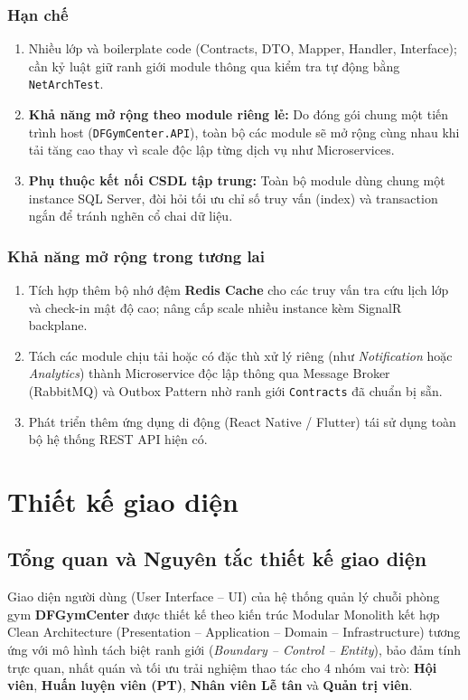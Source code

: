 \documentclass[a4paper,12pt]{article}
\begin{document}
\subsubsection{Hạn chế}
\begin{enumerate}
    \item Nhiều lớp và boilerplate code (Contracts, DTO, Mapper, Handler, Interface); cần kỷ luật giữ ranh giới module thông qua kiểm tra tự động bằng \texttt{NetArchTest}.
    \item \textbf{Khả năng mở rộng theo module riêng lẻ:} Do đóng gói chung một tiến trình host (\texttt{DFGymCenter.API}), toàn bộ các module sẽ mở rộng cùng nhau khi tải tăng cao thay vì scale độc lập từng dịch vụ như Microservices.
    \item \textbf{Phụ thuộc kết nối CSDL tập trung:} Toàn bộ module dùng chung một instance SQL Server, đòi hỏi tối ưu chỉ số truy vấn (index) và transaction ngắn để tránh nghẽn cổ chai dữ liệu.
\end{enumerate}

\subsubsection{Khả năng mở rộng trong tương lai}
\begin{enumerate}
    \item Tích hợp thêm bộ nhớ đệm \textbf{Redis Cache} cho các truy vấn tra cứu lịch lớp và check-in mật độ cao; nâng cấp scale nhiều instance kèm SignalR backplane.
    \item Tách các module chịu tải hoặc có đặc thù xử lý riêng (như \textit{Notification} hoặc \textit{Analytics}) thành Microservice độc lập thông qua Message Broker (RabbitMQ) và Outbox Pattern nhờ ranh giới \texttt{Contracts} đã chuẩn bị sẵn.
    \item Phát triển thêm ứng dụng di động (React Native / Flutter) tái sử dụng toàn bộ hệ thống REST API hiện có.
\end{enumerate}

\newpage
\section{Thiết kế giao diện}

\subsection{Tổng quan và Nguyên tắc thiết kế giao diện}
Giao diện người dùng (User Interface -- UI) của hệ thống quản lý chuỗi phòng gym \textbf{DFGymCenter} được thiết kế theo kiến trúc Modular Monolith kết hợp Clean Architecture (Presentation -- Application -- Domain -- Infrastructure) tương ứng với mô hình tách biệt ranh giới (\textit{Boundary -- Control -- Entity}), bảo đảm tính trực quan, nhất quán và tối ưu trải nghiệm thao tác cho 4 nhóm vai trò: \textbf{Hội viên}, \textbf{Huấn luyện viên (PT)}, \textbf{Nhân viên Lễ tân} và \textbf{Quản trị viên}.
\end{document}
